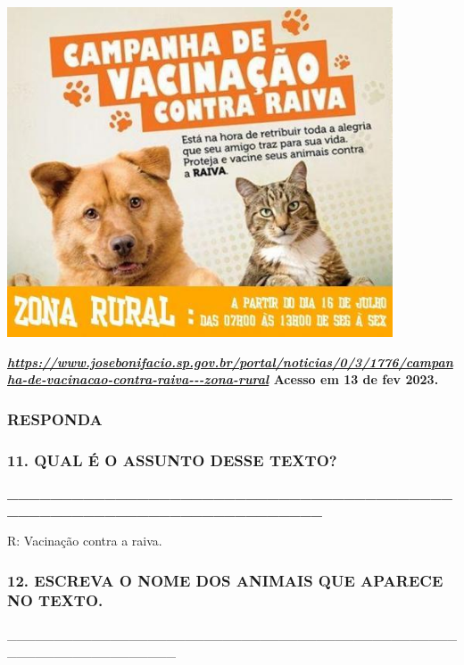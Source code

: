 \includegraphics[width=4.50249in,height=3.85413in]{media/image165.jpg}

\textbf{\href{https://www.josebonifacio.sp.gov.br/portal/noticias/0/3/1776/campanha-de-vacinacao-contra-raiva---zona-rural}{\emph{https://www.josebonifacio.sp.gov.br/portal/noticias/0/3/1776/campanha-de-vacinacao-contra-raiva-\/-\/-zona-rural}}
Acesso em 13 de fev 2023.}

\subsubsection{RESPONDA}\label{responda}

\subsubsection{11. QUAL É O ASSUNTO DESSE
TEXTO?}\label{qual-uxe9-o-assunto-desse-texto-1}

\textbf{\_\_\_\_\_\_\_\_\_\_\_\_\_\_\_\_\_\_\_\_\_\_\_\_\_\_\_\_\_\_\_\_\_\_\_\_\_\_\_\_\_\_\_\_\_\_\_\_\_\_\_\_\_\_\_\_\_\_\_\_\_\_\_\_\_\_\_\_\_\_}

R: Vacinação contra a raiva.

\subsubsection{12. ESCREVA O NOME DOS ANIMAIS QUE APARECE NO
TEXTO.}\label{escreva-o-nome-dos-animais-que-aparece-no-texto.}

\_\_\_\_\_\_\_\_\_\_\_\_\_\_\_\_\_\_\_\_\_\_\_\_\_\_\_\_\_\_\_\_\_\_\_\_\_\_\_\_\_\_\_\_\_\_\_\_\_\_\_\_\_\_\_\_\_\_\_\_\_\_\_\_\_\_

